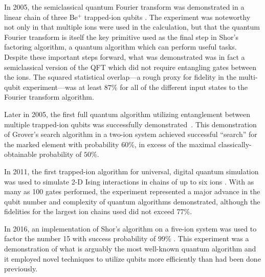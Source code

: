 \documentclass[%
12pt,
 amsmath,amssymb,
]{revtex4-2}
\begin{document}
In 2005, the semiclassical quantum Fourier transform was demonstrated in a linear chain of three Be$^+$ trapped-ion qubits \cite{ChiaveriniQFT2005}. The experiment was noteworthy not only in that multiple ions were used in the calculation, but that the quantum Fourier transform is itself the key primitive used as the final step in Shor's factoring algorithm, a quantum algorithm which can perform useful tasks. Despite these important steps forward, what was demonstrated was in fact a semiclassical version of the QFT which did not require entangling gates between the ions. The squared statistical overlap---a rough proxy for fidelity in the multi-qubit experiment---was at least $87\%$ for all of the different input states to the Fourier transform algorithm.

Later in 2005, the first full quantum algorithm utilizing entanglement between multiple trapped-ion qubits was successfully demonstrated~\cite{BrickmanGroverSearch2005}. This demonstration of Grover's search algorithm in a two-ion system achieved successful ``search'' for the marked element with probability $60 \%$, in excess of the maximal classically-obtainable probability of $50 \%$.

In 2011, the first trapped-ion algorithm for universal, digital quantum simulation \cite{UniversalQSimLloyd1996} was used to simulate 2-D Ising interactions in chains of up to six ions \cite{LanyonDigSim2011}.  With as many as 100 gates performed, the experiment represented a major advance in the qubit number and complexity of quantum algorithms demonstrated, although the fidelities for the largest ion chains used did not exceed $77\%$.

In 2016, an implementation of Shor's algorithm on a five-ion system was used to factor the number 15 with success probability of $99 \%$ \cite{MonzScalableShor2016}. This experiment was a demonstration of what is arguably the most well-known quantum algorithm and it employed novel techniques to utilize qubits more efficiently than had been done previously.
\end{document}
